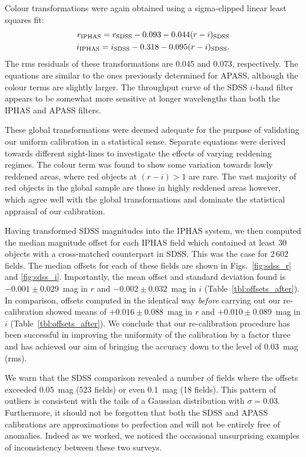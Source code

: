 \documentclass[useAMS,usenatbib]{mn2e}
\begin{document}
Colour transformations were again obtained using a sigma-clipped linear least squares fit:
\begin{eqnarray}
r_{\rm IPHAS} = r_{\rm SDSS} - 0.093 - 0.044(r-i)_{\rm SDSS} \label{eqn:sdss_r} \\
i_{\rm IPHAS} = i_{\rm SDSS} - 0.318 - 0.095(r-i)_{\rm SDSS}. \label{eqn:sdss_i}
\end{eqnarray}
The rms residuals of these transformations are 0.045 and 0.073, respectively.
The equations are similar to the ones
previously determined for APASS,
although the colour terms are slightly larger.
The throughput curve of the SDSS $i$-band filter 
appears to be somewhat more sensitive at longer wavelengths
than both the IPHAS and APASS filters.

These global transformations were deemed adequate
for the purpose of validating our uniform calibration in a statistical sense.
Separate equations were derived towards different sight-lines
to investigate the effects of varying reddening regimes.
The colour term was found 
to show some variation towards lowly reddened areas,
where red objects at $(r-i) > 1$ are rare.
The vast majority of red objects in the global sample
are those in highly reddened areas however,
which agree well with the global transformations
and dominate the statistical appraisal of our calibration.

Having transformed SDSS magnitudes into the IPHAS system,
we then computed the median magnitude offset for each IPHAS field
which contained at least 30 objects with a cross-matched counterpart
in SDSS.  This was the case for 2\,602 fields.
The median offsets for each of these fields
are shown in Figs.~\ref{fig:sdss_r} and \ref{fig:sdss_i}.
Importantly, the mean offset and standard deviation found 
is $-0.001\pm0.029$~mag in $r$
and $-0.002\pm0.032$~mag in $i$ (Table~\ref{tbl:offsets_after}).
In comparison, offsets computed in the identical way
\emph{before} carrying out our re-calibration showed means
of $+0.016\pm0.088$~mag in $r$ and $+0.010\pm0.089$~mag in $i$ (Table~\ref{tbl:offsets_after}).
We conclude that our re-calibration procedure has
been successful in improving the
uniformity of the calibration by a factor three
and has achieved our aim of bringing the
accuracy down to the level of 0.03~mag (rms).

We warn that the SDSS comparison revealed a number of fields where the offsets
exceeded 0.05~mag (523 fields) or even 0.1~mag (18 fields).
This pattern of outliers is consistent with the tails of a Gaussian distribution
with $\sigma=0.03$.  Furthermore, it should not
be forgotten that both the SDSS and APASS calibrations are approximations to
perfection and will not be entirely free of anomalies.  Indeed as we worked, 
we noticed the occasional unsurprising examples of inconsistency between these 
two surveys.
\end{document}
